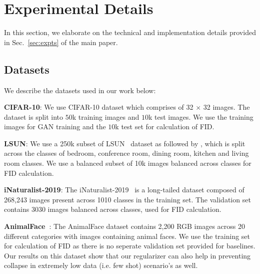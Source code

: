 \documentclass[runningheads,table]{llncs}
\begin{document}
\section{Experimental Details}
\label{sec:supp:exp}
In this section, we elaborate on the technical and implementation details provided in Sec.~\ref{sec:expts} of the main paper.
\subsection{Datasets}
\label{subsec:supp:datasets}
We describe the datasets used in our work below:

\vspace{1mm}\noindent\textbf{CIFAR-10}: We use CIFAR-10 \cite{krizhevsky2009learning} dataset which comprises of 32 $\times$ 32 images. The dataset is split into $50$k training images and $10$k test images. We use the training images for GAN training and the $10$k test set for calculation of FID. 

\vspace{1mm}\noindent\textbf{LSUN}:
We use a 250k subset of LSUN~\cite{journals/corr/YuZSSX15} dataset as followed by \cite{rangwani2021class, santurkar2018classification}, which is split across the classes of bedroom, conference room, dining room, kitchen and living room classes. We use a balanced subset of 10k images balanced across classes for FID calculation.

\vspace{1mm}\noindent\textbf{iNaturalist-2019}:
The iNaturalist-2019~\cite{inat19} is a long-tailed dataset composed of 268,243 images present across 1010 classes in the training set. The validation set contains 3030 images balanced across classes, used for FID calculation.



\vspace{1mm}\noindent\textbf{AnimalFace~\cite{si2011learning}}: The AnimalFace dataset contains 2,200 RGB images across 20 different categories with images containing animal faces. We use the training set for calculation of FID as there is no seperate validation set provided for baselines. Our results on this dataset show that our regularizer can also help in preventing collapse in extremely low data (i.e. few shot) scenario's as well.
\end{document}
